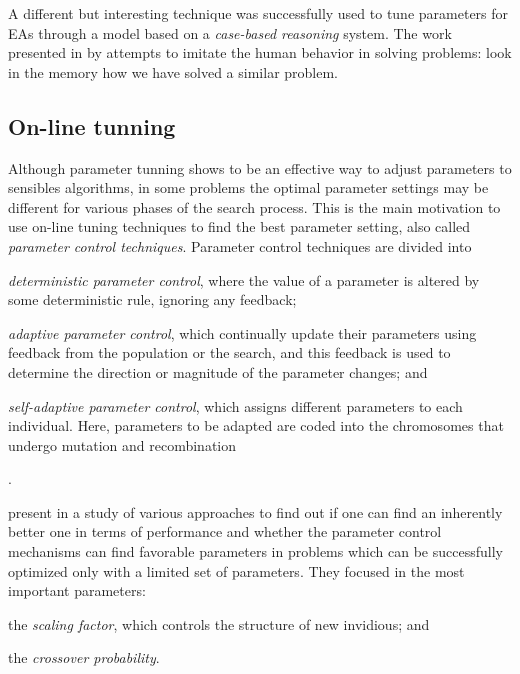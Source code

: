 A different but interesting technique was successfully used to tune parameters for EAs through a model based on a {\it case-based reasoning} system. The work presented in \cite{Yeguas2014} by  attempts to imitate the human behavior in solving problems: look in the memory how we have solved a similar problem.

\subsection{On-line tunning}

Although parameter tunning shows to be an effective way to adjust parameters to sensibles algorithms, in some problems the optimal parameter settings may be different for various phases of the search process. This is the main motivation to use on-line tuning techniques to find the best parameter setting, also called \textit{parameter control techniques}. Parameter control techniques are divided into 
\begin{inparaenum}[i)]
\item \textit{deterministic parameter control}, where the value of a parameter is altered by some deterministic rule, ignoring any feedback; 
\item \textit{adaptive parameter control}, which continually update their parameters using feedback from the population or the search, and this feedback is used to determine the direction or magnitude of the parameter changes; and 
\item \textit{self-adaptive parameter control}, which assigns different parameters to each individual. Here, parameters to be adapted are coded into the chromosomes that undergo mutation and recombination
\end{inparaenum}\cite{Eiben1999}.

 present in \cite{Drozdik} a study of various approaches to find out if one can find an inherently better one in terms of performance and whether the parameter control mechanisms can find favorable parameters in problems which can be successfully optimized only with a limited set of parameters. They focused in the most important parameters: 
\begin{inparaenum}[i)]
\item the \textit{scaling factor}, which controls the structure of new invidious; and
\item the \textit{crossover probability}.
\end{inparaenum}

